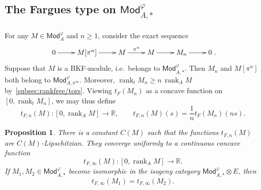 \documentclass[11pt]{article}
\newtheorem{prop}[theo]{Proposition}
\theoremstyle{definition}
\numberwithin{equation}{section}
\numberwithin{figure}{section}
\numberwithin{table}{section}
\newcommand{\Mod}{\mathsf{Mod}}
\DeclareMathOperator{\rank}{rank}
\begin{document}
\subsection{The Fargues type on \texorpdfstring{$\Mod_{A,\ast}^{\varphi}$}{ModA, astphi}}
\label{subsec:FarguesTypeBKF}

\subsubsection{}

For any $M\in\Mod_{A}^{\varphi}$ and $n\geq1$, consider the exact sequence
\[
\xymatrix@C=2pc{0\ar[r] & M[\pi^{n}]\ar[r] & M\ar[r]^{\pi^{n}} & M\ar[r] & M_{n}\ar[r] & 0}.
\]
Suppose that $M$ is a BKF-module, i.e.~belongs to $\Mod_{A,\ast}^{\varphi}$. Then $M_{n}$ and $M[\pi^{n}]$ both belong to $\Mod_{A,\pi^{\infty}}^{\varphi}$. Moreover, $\rank_{t}M_{n}\geq n\,\rank_{A}M$ by~\ref{subsec:rankfree/tors}. Viewing $t_{F}(M_{n})$ as a concave function on $[0,\rank_{t}M_{n}]$, we may thus define
\[
t_{F,n}(M):[0,\rank_{A}M]\rightarrow\mathbb{R},\qquad t_{F,n}(M)(s)={\frac{1}{n}}t_{F}(M_{n})(ns).
\]

\begin{prop}\label{prop:DeftFinfty}
There is a constant $C(M)$ such that the functions $t_{F,n}(M)$ are $C(M)$-Lipschitzian. They converge uniformly to a continuous concave function
\[
t_{F,\infty}(M):[0,\rank_{A}M]\rightarrow\mathbb{R}.
\]
If $M_{1},M_{2}\in\Mod_{A,\ast}^{\varphi}$ become isomorphic in the isogeny category $\Mod_{A,\ast}^{\varphi}\otimes E$, then
\[
t_{F,\infty}(M_{1})=t_{F,\infty}(M_{2}).
\]
\end{prop}
\end{document}
